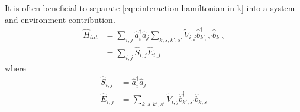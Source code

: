 It is often beneficial to separate
\cref{eqn:interaction hamiltonian in k}
into a system and environment contribution.
\begin{align}
    \hat{H}_{int} & =
    \sum_{i,j}
    \hat{a}^\dagger_{i}\hat{a}_{j}
    \sum_{k,s,k',s'}
    \tilde{V}_{i,j}
    \hat{b}^\dagger_{k',s'}\hat{b}_{k,s} \\
                  & = \sum_{i,j}
    \hat{S}_{i,j} \hat{E}_{i,j}\label{eqn:split interaction hamiltonian}
\end{align}
where
\begin{align}
    \hat{S}_{i,j} & = \hat{a}^\dagger_{i}\hat{a}_{j} \\
    \hat{E}_{i,j} & = \sum_{k,s,k',s'}
    \tilde{V}_{i,j}
    \hat{b}^\dagger_{k',s'}\hat{b}_{k,s}
\end{align}